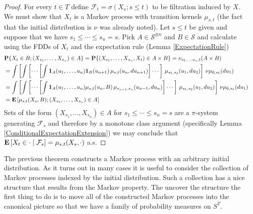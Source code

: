 \begin{proof}
For every $t \in T$ define $\mathcal{F}_t = \sigma(X_s ; s \leq t)$ to
be filtration induced by $X$.  We must show that $X_t$ is a Markov process with transition
kernels $\mu_{s,t}$ (the fact that the initial distribution is $\nu$
was already noted).  Let $s \leq t$ be given and suppose that we have
$s_1 \leq \dotsb \leq s_n = s$.  Pick $A \in \mathcal{S}^{\otimes n}$
and $B \in \mathcal{S}$ and calculate using the FDDs of $X_t$ and the
expectation rule (Lemma \ref{ExpectationRule})
\begin{align*}
&\probability{ X_t \in B ; (X_{s_1}, \dotsc, X_{s_n}) \in A}  = \probability{(X_{s_1}, \dotsc, X_{s_n}, X_t) \in A \times B} =
\nu_{s_1, \dotsc, s_n, t}(A \times B) \\
&=\int \left [ \int \left[ \dotsb \left [ \int \characteristic{A}(u_1,
    \dotsc, u_n) \characteristic{B}(u_{n+1})\, \mu_{s,t}(u_{n}, du_{n+1}) \right] \dotsb
\right] \, \mu_{s_1, s_2}(u_1, du_2) \right ] \, \nu \mu_{0,
s_1}(du_1) \\
&=\int \left [ \int \left[ \dotsb \left [ \int \characteristic{A}(u_1,
    \dotsc, u_n) \mu_{s,t}(u_{n}, B)\, \mu_{s_{n-1},s_n}(u_{n-1}, du_{n}) \right] \dotsb
\right] \, \mu_{s_1, s_2}(u_1, du_2) \right ] \, \nu \mu_{0,
s_1}(du_1) \\
&=\expectation{ \mu_{s,t}(X_s, B) ; (X_{s_1}, \dotsc, X_{s_n}) \in A }
\end{align*}
Sets of the form $(X_{s_1}, \dotsc, X_{s_n}) \in A$ for $s_1 \leq
\dotsb \leq s_n=s$ are a $\pi$-system generating $\mathcal{F}_s$ and
therefore by a monotone class argument (specifically Lemma \ref{ConditionalExpectationExtension}) we may
conclude that $\cexpectationlong{\mathcal{F}_s}{X_t \in \cdot} =
\mu_{s,t}(X_s, \cdot)$ a.s.
\end{proof}

The previous theorem constructs a Markov process with an arbitrary initial distribution.  As it turns out in many cases
it is useful to consider the collection of Markov processes indexed by the initial distribution.  Such a collection has a
nice structure that results from the Markov property.  The uncover the structure the first thing to do is to move all of the 
constructed Markov processes into the canonical picture so that we have a family of probability measures on $S^T$.

